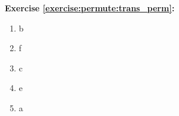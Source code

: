 \noindent\textbf{Exercise \ref{exercise:permute:trans_perm}:}
\begin{multicols}{5}
\begin{enumerate}[{a.}]
\item
b

\item
f

\item
c

\item
e

\item
a
\end{enumerate}
\end{multicols}

